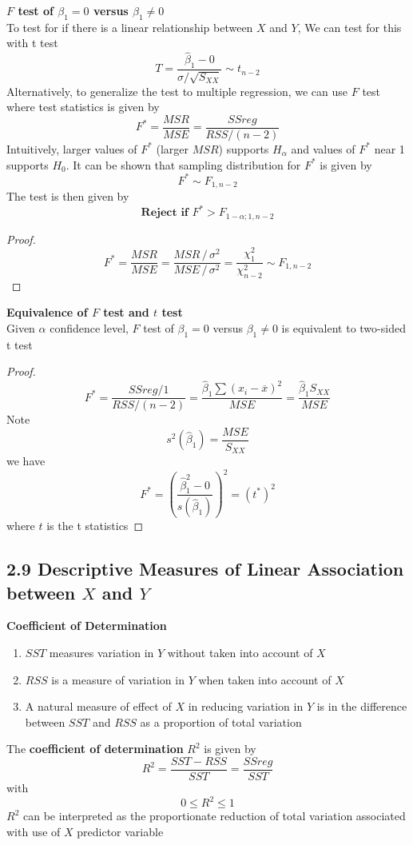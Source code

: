 \documentclass[11pt]{article}
\begin{document}
\begin{defn*}
	\textbf{$F$ test of $\beta_1 = 0$ versus $\beta_1 \neq 0$}\\
	To test for if there is a linear relationship between $X$ and $Y$,
	We can test for this with t test 
	\[
		T = \frac{\hat{\beta}_1 - 0}{\sigma / \sqrt{S_{XX}}} \sim t_{n-2} 
	\]
	Alternatively, to generalize the test to multiple regression, we can use $F$ test where test statistics is given by 
	\[
		F^* = \frac{MSR}{MSE} = \frac{SSreg}{RSS/(n-2)}
	\]
	Intuitively, larger values of $F^*$ (larger $MSR$) supports $H_{\alpha}$ and values of $F^*$ near 1 supports $H_0$. It can be shown that sampling distribution for $F^*$ is given by 
	\[
		F^* \sim F_{1, n-2}
	\]
	The test is then given by 
	\[
		\textbf{Reject if } F^* > F_{1-\alpha; 1, n-2} 
	\]
	\begin{proof}
		\[
			F^* = \frac{MSR}{MSE} = \frac{MSR \,/\, \sigma^2}{MSE \,/\, \sigma^2} 
			= \frac{\chi^2_1}{\chi^2_{n-2}}
			\sim F_{1, n-2}
		\]
	\end{proof}
\end{defn*}

\begin{defn*}
	\textbf{Equivalence of $F$ test and $t$ test}\\
	Given $\alpha$ confidence level, $F$ test of $\beta_1 = 0$ versus $\beta_1 \neq 0$ is equivalent to two-sided t test 
	\begin{proof}
		\[
			F^* 
			= \frac{SSreg/1}{RSS/(n-2)}
			= \frac{\hat{\beta}_1 \sum (x_i - \overline{x})^2}{MSE}
			= \frac{\hat{\beta}_1 S_{XX}}{MSE}
		\]
		Note 
		\[
			s^2(\hat{\beta}_1) = \frac{MSE}{S_{XX}}
		\]
		we have 
		\[
			F^* = \left( \frac{\hat{\beta}_1^2 - 0}{s(\hat{\beta}_1)} \right)^2
			= (t^*)^2
		\]
		where $t$ is the t statistics
	\end{proof}
\end{defn*}


\subsection*{2.9 Descriptive Measures of \textbf{Linear Association} between $X$ and $Y$}

\begin{defn*}
	\textbf{Coefficient of Determination} \\
	\begin{enumerate}
		\item $SST$ measures variation in $Y$ without taken into account of $X$
		\item $RSS$ is a measure of variation in $Y$ when taken into account of $X$
		\item A natural measure of effect of $X$ in reducing variation in $Y$ is in the difference between $SST$ and $RSS$ as a proportion of total variation 
	\end{enumerate}
	The \textbf{coefficient of determination} $R^2$ is given by
	\[
		R^2= \frac{SST - RSS}{SST}= \frac{SSreg}{SST}
	\]
	with 
	\[
		0 \leq R^2 \leq 1
	\]
	$R^2$ can be interpreted as the proportionate reduction of total variation associated with use of $X$ predictor variable
\end{defn*}
\end{document}
